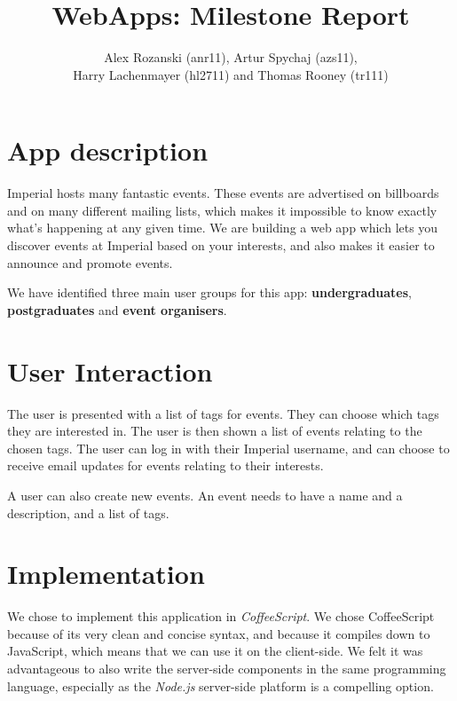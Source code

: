 \documentclass[a4wide, 11pt]{article}
\begin{document}
\title{WebApps: Milestone Report}
\author{Alex Rozanski (anr11), Artur Spychaj (azs11),\\ Harry Lachenmayer (hl2711) and Thomas Rooney (tr111)}

\maketitle

\section*{App description}

Imperial hosts many fantastic events. These events are advertised on billboards and on many different mailing lists, which makes it impossible to know exactly what's happening at any given time. We are building a web app which lets you discover events at Imperial based on your interests, and also makes it easier to announce and promote events.

We have identified three main user groups for this app: \textbf{undergraduates}, \textbf{postgraduates} and \textbf{event organisers}.

\section*{User Interaction}

The user is presented with a list of tags for events. They can choose which tags they are interested in. The user is then shown a list of events relating to the chosen tags. The user can log in with their Imperial username, and can choose to receive email updates for events relating to their interests.

A user can also create new events. An event needs to have a name and a description, and a list of tags.

\section*{Implementation}

We chose to implement this application in \textit{CoffeeScript}. We chose CoffeeScript because of its very clean and concise syntax, and because it compiles down to JavaScript, which means that we can use it on the client-side. We felt it was advantageous to also write the server-side components in the same programming language, especially as the \textit{Node.js} server-side platform is a compelling option.
\end{document}
